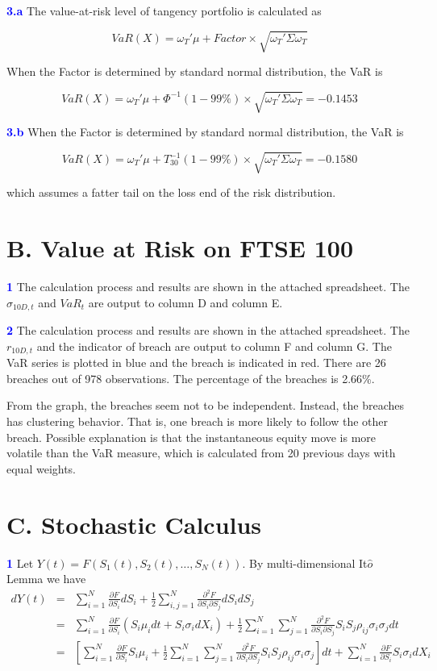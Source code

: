\documentclass[a4paper,11pt] {article}
\begin{document}
\textcolor{blue}{\bf 3.a } The value-at-risk level of tangency portfolio is calculated as

$$
VaR(X) = \omega_T' \mu + Factor \times \sqrt{\omega_T'\Sigma\omega_T}
$$

When the Factor is determined by standard normal distribution, the VaR is

$$
VaR(X) = \omega_T' \mu + \Phi^{-1}(1-99\%) \times \sqrt{\omega_T'\Sigma\omega_T} = -0.1453
$$


\textcolor{blue}{\bf 3.b } When the Factor is determined by standard normal distribution, the VaR is

$$
VaR(X) = \omega_T' \mu + T_30^{-1}(1-99\%) \times \sqrt{\omega_T'\Sigma\omega_T} = -0.1580
$$

which assumes a fatter tail on the loss end of the risk distribution.

\section*{B. Value at Risk on FTSE 100}
\textcolor{blue}{\bf 1 } The calculation process and results are shown in the attached spreadsheet. The $\sigma_{10D,t}$ and $VaR_t$ are output to column D and column E.

\textcolor{blue}{\bf 2 } The calculation process and results are shown in the attached spreadsheet. The $r_{10D,t}$ and the indicator of breach are output to column F and column G. The VaR series is plotted in blue and the breach is indicated in red. There are 26 breaches out of 978 observations. The percentage of the breaches is 2.66\%.

From the graph, the breaches seem not to be independent. Instead, the breaches has clustering behavior. That is, one breach is more likely to follow the other breach. Possible explanation is that the instantaneous equity move is more volatile than the VaR measure, which is calculated from 20 previous days with equal weights.

\section*{C. Stochastic Calculus}
\textcolor{blue}{\bf 1 } Let $Y(t) = F(S_1(t), S_2(t),\ldots,S_N(t))$. By multi-dimensional It$\hat{o}$ Lemma we have
\begin{eqnarray*}
dY(t) &=& \sum_{i=1}^N \frac{\partial F}{\partial S_i} dS_i + \frac{1}{2}\sum_{i,j=1}^N \frac{\partial^2 F}{\partial S_i \partial S_j} dS_i dS_j \\
      &=& \sum_{i=1}^N \frac{\partial F}{\partial S_i}\left(S_i\mu_i dt + S_i \sigma_i dX_i\right) + \frac{1}{2}\sum_{i=1}^N\sum_{j=1}^N \frac{\partial^2 F}{\partial S_i \partial S_j} S_i S_j \rho_{ij} \sigma_i \sigma_j dt \\
      &=& \left[\sum_{i=1}^N \frac{\partial F}{\partial S_i}S_i\mu_i + \frac{1}{2}\sum_{i=1}^N\sum_{j=1}^N \frac{\partial^2 F}{\partial S_i \partial S_j} S_i S_j \rho_{ij} \sigma_i \sigma_j\right] dt  + \sum_{i=1}^N \frac{\partial F}{\partial S_i}S_i \sigma_i dX_i
\end{eqnarray*}
\end{document}
